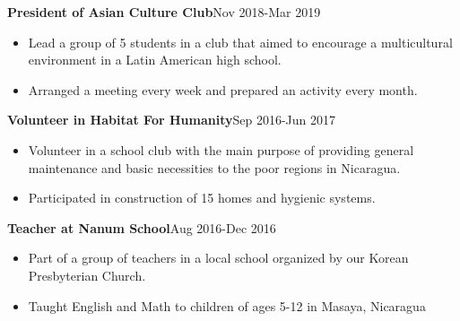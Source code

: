 \documentclass[a4paper]{article}
\begin{document}
\vspace*{1mm}

{\textbf{President of Asian Culture Club}\hfill{Nov 2018-Mar 2019}}\\
    \begin{itemize}[noitemsep]
        \item Lead a group of 5 students in a club that aimed to encourage a multicultural environment in a Latin American high school. 
        \item Arranged a meeting every week and prepared an activity every month.\\
    \end{itemize}
\vspace*{1mm}

{\textbf{Volunteer in Habitat For Humanity}\hfill{Sep 2016-Jun 2017}}\\
    \begin{itemize}[noitemsep]
        \item Volunteer in a school club with the main purpose of providing general 
        maintenance and basic necessities to the poor regions in Nicaragua. 
        \item Participated in construction of 15 homes and hygienic systems.\\
    \end{itemize}
\vspace*{1mm}

{\textbf{Teacher at Nanum School}\hfill{Aug 2016-Dec 2016}}\\
    \begin{itemize}[noitemsep]
        \item Part of a group of teachers in a local school organized by our Korean Presbyterian Church. 
        \item Taught English and Math to children of ages 5-12 in Masaya, Nicaragua\\
    \end{itemize}


\end{document}
